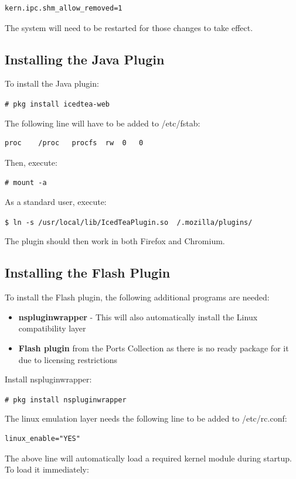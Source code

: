 \documentclass[a4paper,twoside,12pt]{article}
\newcommand{\coderoot}[1]{\texttt{\# #1}}
\newcommand{\codeuser}[1]{\texttt{\$ #1}}
\begin{document}
\begin{verbatim}
kern.ipc.shm_allow_removed=1
\end{verbatim}

The system will need to be restarted for those changes to take effect.

\subsection{Installing the Java Plugin}
To install the Java plugin:

\coderoot{pkg install icedtea-web}

The following line will have to be added to /etc/fstab:

\begin{verbatim}
proc	/proc	procfs	rw	0	0
\end{verbatim}

Then, execute:

\coderoot{mount -a}

As a standard user, execute:

\codeuser{ln -s /usr/local/lib/IcedTeaPlugin.so ~/.mozilla/plugins/}

The plugin should then work in both Firefox and Chromium.

\subsection{Installing the Flash Plugin}
To install the Flash plugin, the following additional programs are needed:

\begin{itemize}
\item \textbf{nspluginwrapper} - This will also automatically install the Linux compatibility layer
\item \textbf{Flash plugin} from the Ports Collection as there is no ready package for it due to licensing restrictions
\end{itemize}

Install nspluginwrapper:

\coderoot{pkg install nspluginwrapper}

The linux emulation layer needs the following line to be added to /etc/rc.conf:

\begin{verbatim}
linux_enable="YES"
\end{verbatim}

The above line will automatically load a required kernel module during startup. To load it immediately:
\end{document}
